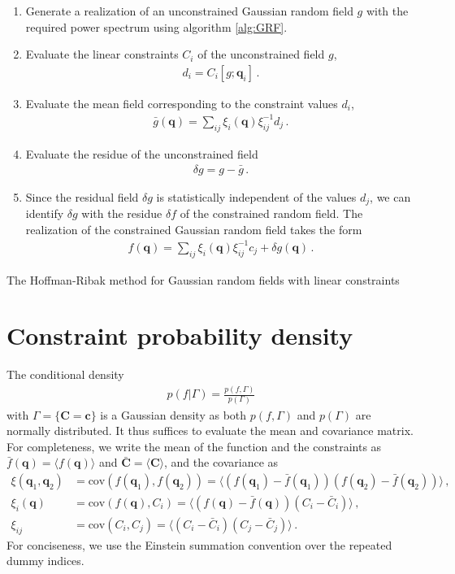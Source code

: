 \documentclass[a4paper, 11pt]{article}
\begin{document}
\begin{algorithm}[H]
\SetAlgoLined
\begin{enumerate}[itemsep=1ex, leftmargin=0cm, rightmargin=1cm]
\item Generate a realization of an unconstrained Gaussian random field $g$ with the required power spectrum using algorithm \ref{alg:GRF}.
\item Evaluate the linear constraints $C_i$ of the unconstrained field $g$,
\begin{align}
d_i = C_i[g;\bm{q}_i]\,.
\end{align} 
\item Evaluate the mean field corresponding to the constraint values $d_i$,
\begin{align}
\bar{g}(\bm{q}) = \sum_{ij}\xi_i(\bm{q}) \xi^{-1}_{ij} d_j\,.
\end{align}
\item Evaluate the residue of the unconstrained field 
\begin{align}
\delta g=g - \bar{g}\,.
\end{align}
\item Since the residual field $\delta g$ is statistically independent of the values $d_j$, we can identify $\delta g$ with the residue $\delta f$ of the constrained random field. The realization of the constrained Gaussian random field takes the form
\begin{align}
f(\bm{q}) = \sum_{ij}\xi_i(\bm{q}) \xi^{-1}_{ij} c_j + \delta g(\bm{q})\,.
\end{align}
\end{enumerate}
 \caption{The Hoffman-Ribak method for Gaussian random fields with linear constraints}
 \label{alg:HoffmanRibak}
\end{algorithm}


\section{Constraint probability density}\label{ap:constraintDensity}
The conditional density 
\begin{align}
p(f|\Gamma) =\frac{p(f, \Gamma)}{p(\Gamma)}
\end{align}
with $\Gamma = \{\bm{C} = \bm{c}\}$ is a Gaussian density as both $p(f,\Gamma)$ and $p(\Gamma)$ are normally distributed. It thus suffices to evaluate the mean and covariance matrix. For completeness, we write the mean of the function and the constraints as $\bar{f}(\bm{q})=\langle f(\bm{q}) \rangle$ and $\bar{\bm{C}}=\langle \bm{C}\rangle$, and the covariance as
\begin{align}
\xi(\bm{q}_1,\bm{q}_2)& = \text{cov}(f(\bm{q}_1),f(\bm{q}_2))= \langle (f(\bm{q}_1) - \bar{f}(\bm{q}_1))(f(\bm{q}_2) - \bar{f}(\bm{q}_2))\rangle\,,\\
\xi_i(\bm{q}) &= \text{cov}(f(\bm{q}),C_i) = \langle (f(\bm{q})-\bar{f}(\bm{q}))(C_i - \bar{C}_i)\rangle\,,\\
\xi_{ij} &= \text{cov}(C_i,C_j) = \langle (C_i - \bar{C}_i)(C_j-\bar{C}_j)\rangle\,.
\end{align}
For conciseness, we use the Einstein summation convention over the repeated dummy indices.
\end{document}
